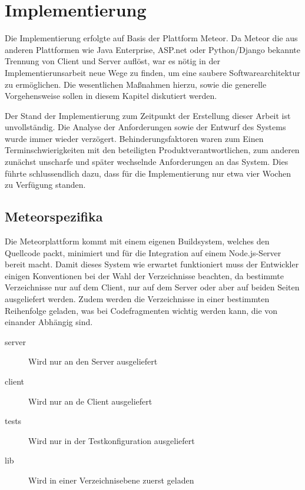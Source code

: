 
\chapter{Implementierung} %

\label{ch:implementierung}


Die Implementierung erfolgte auf Basis der Plattform Meteor. Da Meteor die aus
anderen Plattformen wie Java Enterprise, ASP.net oder Python/Django bekannte
Trennung von Client und Server auflöst, war es nötig in der
Implementierunsarbeit neue Wege zu finden, um eine saubere Softwarearchitektur
zu ermöglichen. Die  wesentlichen Maßnahmen hierzu, sowie die generelle
Vorgehensweise sollen in diesem Kapitel diskutiert werden.

Der Stand der Implementierung zum Zeitpunkt der Erstellung dieser Arbeit ist
unvollständig. Die Analyse der Anforderungen sowie der Entwurf des Systems wurde
immer wieder verzögert. Behinderungsfaktoren waren zum Einen
Terminschwierigkeiten mit den beteiligten Produktverantwortlichen, zum anderen
zunächst unscharfe und später wechselnde Anforderungen an das System. Dies
führte schlussendlich dazu, dass für die Implementierung nur etwa vier Wochen zu
Verfügung standen.

\section{Meteorspezifika}

Die Meteorplattform kommt mit einem eigenen Buildsystem, welches den Quellcode
packt, minimiert und für die Integration auf einem Node.js-Server bereit macht.
Damit dieses System wie erwartet funktioniert muss der Entwickler einigen
Konventionen bei der Wahl der Verzeichnisse beachten, da bestimmte Verzeichnisse
nur auf dem Client, nur auf dem Server oder aber auf beiden Seiten ausgeliefert
werden. Zudem werden die Verzeichnisse in einer bestimmten Reihenfolge geladen,
was bei Codefragmenten wichtig werden kann, die von einander Abhängig sind.

\begin{description}
  \item[server]{Wird nur an den Server ausgeliefert}
  \item[client]{Wird nur an de Client ausgeliefert}
  \item[tests]{Wird nur in der Testkonfiguration ausgeliefert}
  \item[lib]{Wird in einer Verzeichnisebene zuerst geladen}
\end{description}

